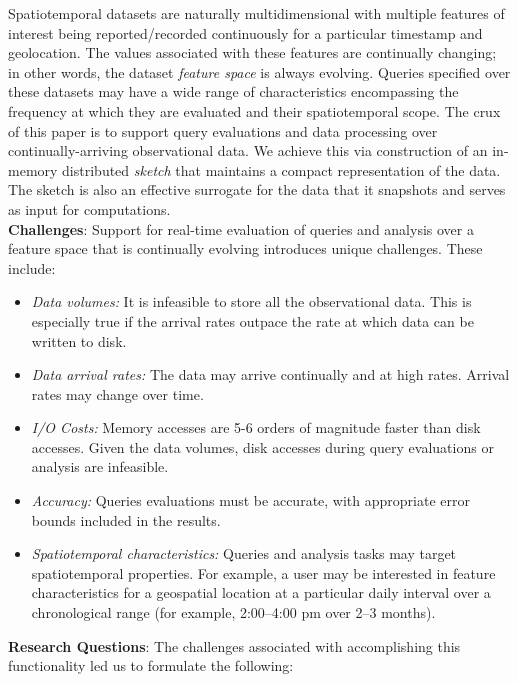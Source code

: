Spatiotemporal datasets are naturally multidimensional with multiple features of interest being reported/recorded continuously for a particular timestamp and geolocation. The values associated with these features are continually changing; in other words, the dataset \emph{feature space} is always evolving.  Queries specified over these datasets may have a wide range of characteristics encompassing the frequency at which they are evaluated and their spatiotemporal scope. The crux of this paper is to support query evaluations and data processing over continually-arriving observational data. We achieve this via construction of an in-memory distributed \emph{sketch} that maintains a compact representation of the data.
The sketch is also an effective surrogate for the data that it snapshots and serves as input for computations.
%
%
\vspace{0.7em}\\
%
\textbf{Challenges}:
Support for real-time evaluation of queries and analysis over a feature space that is continually evolving introduces unique challenges. These include:
\begin{itemize}[leftmargin=*]
    \item   \emph{Data volumes:} It is infeasible to store all the observational data. This is especially true if the arrival rates outpace the rate at which data can be written to disk.
    \item   \emph{Data arrival rates:} The data may arrive continually and at high rates. Arrival rates may change over time.
    \item \emph{I/O Costs:} Memory accesses are 5-6 orders of magnitude faster than disk accesses. Given the data volumes, disk accesses during query evaluations or analysis are infeasible.
    \item   \emph{Accuracy:} Queries evaluations must be accurate, with appropriate error bounds included in the results.
    \item   \emph{Spatiotemporal characteristics:} Queries and analysis tasks may target spatiotemporal properties. For example, a user may be interested in feature characteristics for a geospatial location at a particular daily interval over a chronological range (for example, 2:00--4:00 pm over 2--3 months).
\end{itemize}
%
\vspace{0.7em}
%
\textbf{Research Questions}:
The challenges associated with accomplishing this functionality led us to formulate the following:
